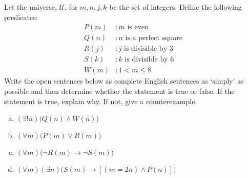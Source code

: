 \documentclass[11pt,letterpaper]{article}
\begin{document}

 Let the universe, $\mathcal{U}$, for $m, n, j, k$ be the set of integers. Define the following predicates:
	\[
	\begin{aligned}
	P(m) &\colon m \text{ is even} \\
	Q(n) &\colon n \text{ is a perfect square} \\
	R(j) &\colon j \text{ is divisible by 3} \\
	S(k) &\colon k \text{ is divisible by 6} \\
	W(m) &\colon 1 < m \leq 8
	\end{aligned}
	\]
Write the open sentences below as complete English sentences as `simply' as possible and then determine whether the statement is true or false. If the statement is true, explain why. If not, give a counterexample. 
	\begin{enumerate}[(a)]
	\item $(\exists! n) \big( Q(n) \wedge W(n) \big)$ 
	\item $(\forall m) \big( P(m) \vee R(m) \big)$ 
	\item $(\forall m) \big( \neg R(m) \to \neg S(m) \big)$ 
	\item $(\forall m) (\exists n) \big( S(m) \to [(m= 2n) \wedge P(n)] \big)$ 
	\end{enumerate} \pspace
\end{document}
